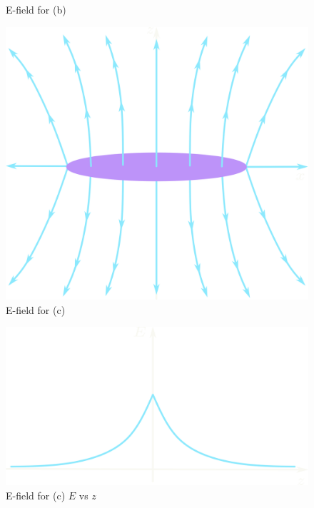 \documentclass[../main.tex]{subfiles}
\begin{document}
\begin{figure}[ht]
\begin{minipage}[b]{0.3\linewidth}
        \caption{E-field for (b)}
    \end{minipage}
    \hfill
    \begin{minipage}[b]{0.3\linewidth}
        \centering
        \includegraphics[width=\linewidth]{images/hw2_26c.png}
        \caption{E-field for (c)}
    \end{minipage}
\end{figure}
\begin{figure}[ht]
    \centering
    \includegraphics[width=0.3\linewidth]{images/hw2_26c2.png}
    \caption{E-field for (c) $E$ vs $z$}
\end{figure}

\clearpage 
\newpage 
\end{document}

